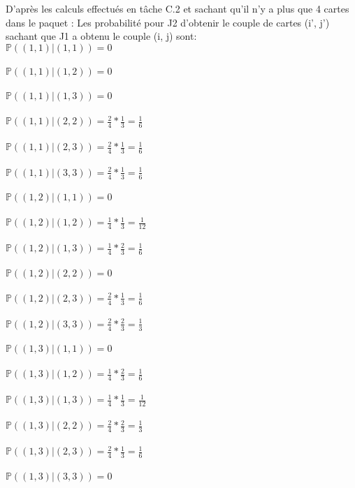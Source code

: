 \documentclass{article}
\begin{document}
D'après les calculs effectués en tâche C.2 et sachant qu'il n'y a plus que 4 cartes dans le paquet :
Les probabilité pour J2 d'obtenir le couple de cartes (i', j') sachant que J1 a obtenu le couple (i, j) sont:\\

$\mathbb{P}((1,1) | (1,1)) = 0$ \\ \\
$\mathbb{P}((1,1) | (1,2)) = 0$ \\ \\
$\mathbb{P}((1,1) | (1,3)) = 0$ \\ \\
$\mathbb{P}((1,1) | (2,2)) = \frac{2}{4} * \frac{1}{3} = \frac{1}{6}$\\ \\
$\mathbb{P}((1,1) | (2,3)) = \frac{2}{4} * \frac{1}{3} = \frac{1}{6}$\\ \\
$\mathbb{P}((1,1) | (3,3)) = \frac{2}{4} * \frac{1}{3} = \frac{1}{6}$\\ \\

$\mathbb{P}((1,2) | (1,1)) = 0$\\ \\
$\mathbb{P}((1,2) | (1,2)) = \frac{1}{4} * \frac{1}{3} = \frac{1}{12}$\\ \\
$\mathbb{P}((1,2) | (1,3)) = \frac{1}{4} * \frac{2}{3} = \frac{1}{6}$\\ \\
$\mathbb{P}((1,2) | (2,2)) = 0$\\ \\
$\mathbb{P}((1,2) | (2,3)) = \frac{2}{4} * \frac{1}{3} = \frac{1}{6}$\\ \\
$\mathbb{P}((1,2) | (3,3)) = \frac{2}{4} * \frac{2}{3} = \frac{1}{3}$\\ \\

$\mathbb{P}((1,3) | (1,1)) = 0$\\ \\
$\mathbb{P}((1,3) | (1,2)) = \frac{1}{4} * \frac{2}{3} = \frac{1}{6}$\\ \\
$\mathbb{P}((1,3) | (1,3)) = \frac{1}{4} * \frac{1}{3} = \frac{1}{12}$\\ \\
$\mathbb{P}((1,3) | (2,2)) = \frac{2}{4} * \frac{2}{3} = \frac{1}{3}$\\ \\
$\mathbb{P}((1,3) | (2,3)) = \frac{2}{4} * \frac{1}{3} = \frac{1}{6}$\\ \\
$\mathbb{P}((1,3) | (3,3)) = 0$\\ \\
\end{document}
